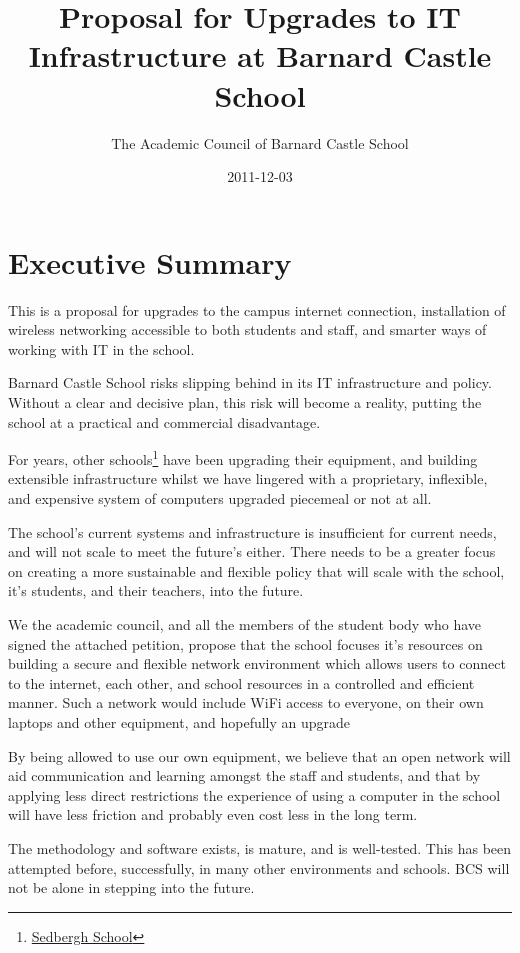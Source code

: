 \documentclass[a4paper,leqno,titlepage]{article}
\title{Proposal for Upgrades to IT Infrastructure at Barnard Castle School}
\author{The Academic Council of Barnard Castle School}
\date{2011-12-03}
\begin{document}
\maketitle

\section{Executive Summary}

This is a proposal for upgrades to the campus internet connection,
installation of wireless networking accessible to both students and staff,
and smarter ways of working with IT in the school. 

Barnard Castle School risks slipping behind in its
IT infrastructure and policy.
Without a clear and decisive plan, this risk will become a reality, putting
the school at a practical and commercial disadvantage.


For years, other schools\footnote{\href{http://www.sedberghschool.org/ict.html}{Sedbergh School}} 
have been upgrading their equipment, and building extensible infrastructure
whilst we have lingered with a proprietary, inflexible, and expensive system of
computers upgraded piecemeal or not at all.


The school's current systems and infrastructure is insufficient for current
needs, and will not scale to meet the future's either.
There needs to be a greater focus on creating a more sustainable and flexible
policy that will scale with the school, it's students, and their teachers, into
the future.


We the academic council, and all the members of the student body who have signed
the attached petition, propose that the school focuses it's resources on building
a secure and flexible network environment which allows users to connect to the
internet, each other, and school resources in a controlled and efficient manner.
Such a network would include WiFi access to everyone, on their own laptops and
other equipment, and hopefully an upgrade 


By being allowed to use our own equipment, we believe that an open network will
aid communication and learning amongst the staff and students, and that by
applying less direct restrictions the experience of using a computer in the
school will have less friction and probably even cost less in the long term.


The methodology and software exists, is mature, and is well-tested. This has been
attempted before, successfully, in many other environments and schools. BCS will
not be alone in stepping into the future.
\end{document}
